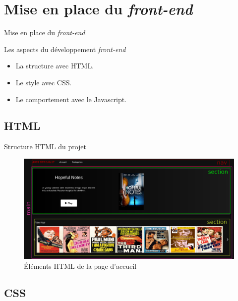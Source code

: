 \section{Mise en place du \textit{front-end}}

\begin{frame}{Mise en place du \textit{front-end}}
  \begin{block}{Les aspects du développement \textit{front-end}}
    \begin{itemize}
    \item La structure avec HTML.
    \item Le style avec CSS.
    \item Le comportement avec le Javascript.
    \end{itemize}
  \end{block}
\end{frame}

\subsection{HTML}
\begin{frame}{Structure HTML du projet}
  \begin{figure}
  \begin{center}
    \includegraphics[scale=0.15]{img/html.png}
  \end{center}
  \caption{Éléments HTML de la page d'accueil}
  \end{figure}
\end{frame}

\subsection{CSS}

